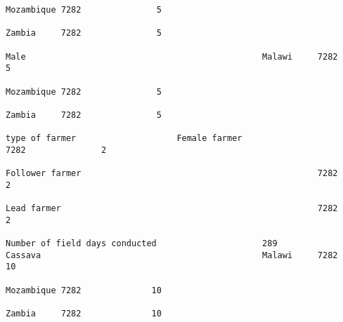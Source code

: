 \documentclass[11pt]{article}
\begin{document}
\begin{Verbatim}[commandchars=\\\{\}]
                                                                                                                                                                                                                 Mozambique 7282               5  
                                                                                                                                                                                                                 Zambia     7282               5  
                                                                                                                                                              Male                                               Malawi     7282               5  
                                                                                                                                                                                                                 Mozambique 7282               5  
                                                                                                                                                                                                                 Zambia     7282               5  
                                                                                                                            type of farmer                    Female farmer                                                 7282               2  
                                                                                                                                                              Follower farmer                                               7282               2  
                                                                                                                                                              Lead farmer                                                   7282               2  
                                                                         Number of field days conducted                     289                               Cassava                                            Malawi     7282              10  
                                                                                                                                                                                                                 Mozambique 7282              10  
                                                                                                                                                                                                                 Zambia     7282              10  

\end{Verbatim}
\end{document}
